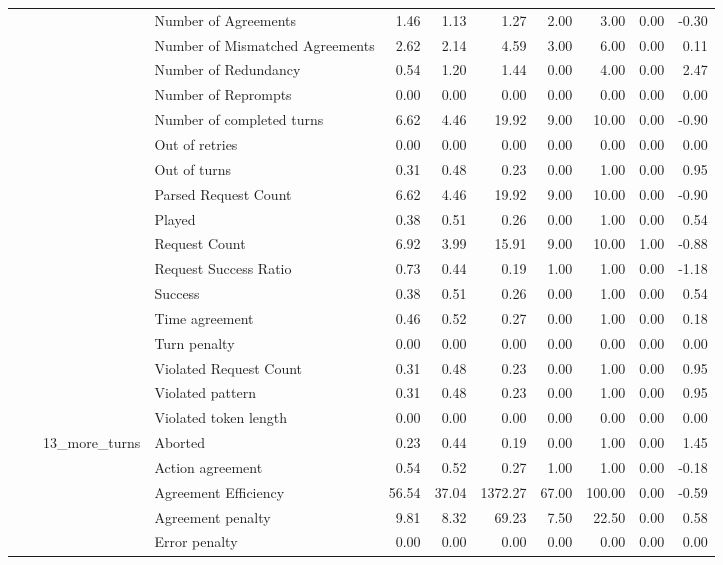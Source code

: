 \begin{tabular}{llllrrrrrrr}
 &  &  & Number of Agreements & 1.46 & 1.13 & 1.27 & 2.00 & 3.00 & 0.00 & -0.30 \\
 &  &  & Number of Mismatched Agreements & 2.62 & 2.14 & 4.59 & 3.00 & 6.00 & 0.00 & 0.11 \\
 &  &  & Number of Redundancy & 0.54 & 1.20 & 1.44 & 0.00 & 4.00 & 0.00 & 2.47 \\
 &  &  & Number of Reprompts & 0.00 & 0.00 & 0.00 & 0.00 & 0.00 & 0.00 & 0.00 \\
 &  &  & Number of completed turns & 6.62 & 4.46 & 19.92 & 9.00 & 10.00 & 0.00 & -0.90 \\
 &  &  & Out of retries & 0.00 & 0.00 & 0.00 & 0.00 & 0.00 & 0.00 & 0.00 \\
 &  &  & Out of turns & 0.31 & 0.48 & 0.23 & 0.00 & 1.00 & 0.00 & 0.95 \\
 &  &  & Parsed Request Count & 6.62 & 4.46 & 19.92 & 9.00 & 10.00 & 0.00 & -0.90 \\
 &  &  & Played & 0.38 & 0.51 & 0.26 & 0.00 & 1.00 & 0.00 & 0.54 \\
 &  &  & Request Count & 6.92 & 3.99 & 15.91 & 9.00 & 10.00 & 1.00 & -0.88 \\
 &  &  & Request Success Ratio & 0.73 & 0.44 & 0.19 & 1.00 & 1.00 & 0.00 & -1.18 \\
 &  &  & Success & 0.38 & 0.51 & 0.26 & 0.00 & 1.00 & 0.00 & 0.54 \\
 &  &  & Time agreement & 0.46 & 0.52 & 0.27 & 0.00 & 1.00 & 0.00 & 0.18 \\
 &  &  & Turn penalty & 0.00 & 0.00 & 0.00 & 0.00 & 0.00 & 0.00 & 0.00 \\
 &  &  & Violated Request Count & 0.31 & 0.48 & 0.23 & 0.00 & 1.00 & 0.00 & 0.95 \\
 &  &  & Violated pattern & 0.31 & 0.48 & 0.23 & 0.00 & 1.00 & 0.00 & 0.95 \\
 &  &  & Violated token length & 0.00 & 0.00 & 0.00 & 0.00 & 0.00 & 0.00 & 0.00 \\
\cline{3-11}
 &  & \multirow[t]{27}{*}{13_more_turns} & Aborted & 0.23 & 0.44 & 0.19 & 0.00 & 1.00 & 0.00 & 1.45 \\
 &  &  & Action agreement & 0.54 & 0.52 & 0.27 & 1.00 & 1.00 & 0.00 & -0.18 \\
 &  &  & Agreement Efficiency & 56.54 & 37.04 & 1372.27 & 67.00 & 100.00 & 0.00 & -0.59 \\
 &  &  & Agreement penalty & 9.81 & 8.32 & 69.23 & 7.50 & 22.50 & 0.00 & 0.58 \\
 &  &  & Error penalty & 0.00 & 0.00 & 0.00 & 0.00 & 0.00 & 0.00 & 0.00 \\

\end{tabular}
